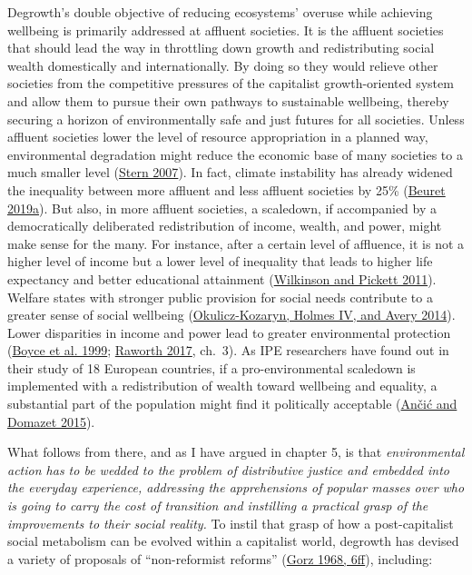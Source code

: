 \documentclass[a4paper, nobind]{templates/ociamthesis}
\begin{document}
Degrowth's double objective of reducing ecosystems' overuse while achieving wellbeing is primarily addressed at affluent societies. It is the affluent societies that should lead the way in throttling down growth and redistributing social wealth domestically and internationally. By doing so they would relieve other societies from the competitive pressures of the capitalist growth-oriented system and allow them to pursue their own pathways to sustainable wellbeing, thereby securing a horizon of environmentally safe and just futures for all societies. Unless affluent societies lower the level of resource appropriation in a planned way, environmental degradation might reduce the economic base of many societies to a much smaller level (\protect\hyperlink{ref-stern_economics_2007}{Stern 2007}). In fact, climate instability has already widened the inequality between more affluent and less affluent societies by 25\% (\protect\hyperlink{ref-beuret_global_2019}{Beuret 2019a}). But also, in more affluent societies, a scaledown, if accompanied by a democratically deliberated redistribution of income, wealth, and power, might make sense for the many. For instance, after a certain level of affluence, it is not a higher level of income but a lower level of inequality that leads to higher life expectancy and better educational attainment (\protect\hyperlink{ref-wilkinson_greater_2011}{Wilkinson and Pickett 2011}). Welfare states with stronger public provision for social needs contribute to a greater sense of social wellbeing (\protect\hyperlink{ref-okulicz-kozaryn_subjective_2014}{Okulicz-Kozaryn, Holmes IV, and Avery 2014}). Lower disparities in income and power lead to greater environmental protection (\protect\hyperlink{ref-boyce_power_1999}{Boyce et al. 1999}; \protect\hyperlink{ref-raworth_doughnut_2017}{Raworth 2017}, ch.~3). As IPE researchers have found out in their study of 18 European countries, if a pro-environmental scaledown is implemented with a redistribution of wealth toward wellbeing and equality, a substantial part of the population might find it politically acceptable (\protect\hyperlink{ref-ancic_potential_2015}{Ančić and Domazet 2015}).

What follows from there, and as I have argued in chapter 5, is that \emph{environmental action has to be wedded to the problem of distributive justice and embedded into the everyday experience, addressing the apprehensions of popular masses over who is going to carry the cost of transition and instilling a practical grasp of the improvements to their social reality.} To instil that grasp of how a post-capitalist social metabolism can be evolved within a capitalist world, degrowth has devised a variety of proposals of ``non-reformist reforms'' (\protect\hyperlink{ref-gorz_strategy_1968}{Gorz 1968, 6ff}), including:
\end{document}

